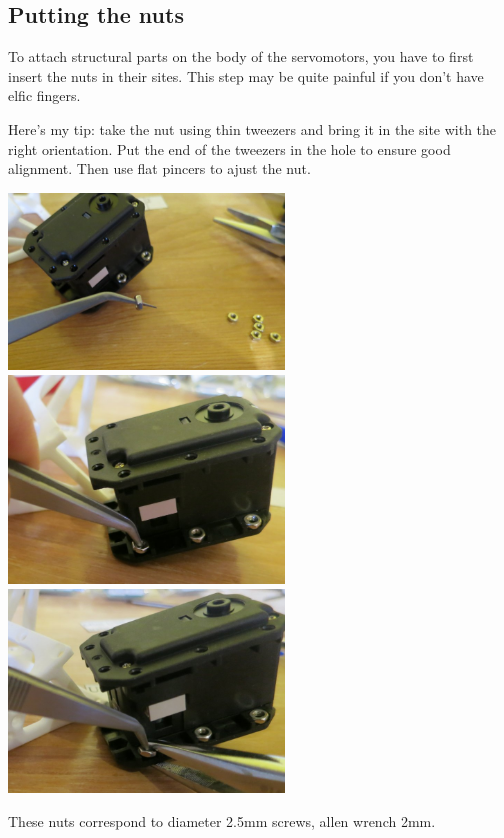 \documentclass{article}
\begin{document}
\subsection{Putting the nuts}

To attach structural parts on the body of the servomotors, you have to first insert the nuts in their sites. This step may be quite painful if you don't have elfic fingers.

Here's my tip: take the nut using thin tweezers and bring it in the site with the right orientation. Put the end of the tweezers in the hole to ensure good alignment. Then use flat pincers to ajust the nut.

 \begin{center}
  \includegraphics[width=0.55\textwidth]{img/nuts1}
  \includegraphics[width=0.55\textwidth]{img/nuts2}
  \includegraphics[width=0.55\textwidth]{img/nuts3}
 \end{center}
 
 These nuts correspond to diameter 2.5mm screws, allen wrench 2mm.
 
\end{document}
